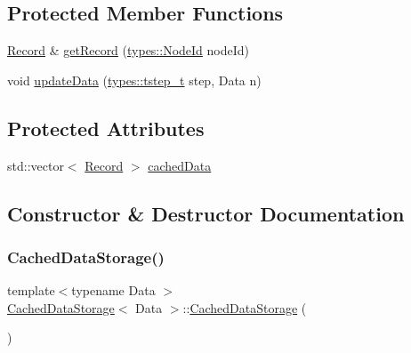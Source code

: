 \subsection*{Protected Member Functions}
\begin{DoxyCompactItemize}
\item 
\mbox{\hyperlink{struct_cached_data_storage_1_1_record}{Record}} \& \mbox{\hyperlink{class_cached_data_storage_a8a09bdedf4fd7f8695149aade0dbf594}{get\+Record}} (\mbox{\hyperlink{classtypes_1_1_node_id}{types\+::\+Node\+Id}} node\+Id)
\item 
void \mbox{\hyperlink{class_cached_data_storage_a12f747193f32aa3b28a6058fb157b693}{update\+Data}} (\mbox{\hyperlink{namespacetypes_a9dc53a5ce11a196d82a6983030de8028}{types\+::tstep\+\_\+t}} step, Data n)
\end{DoxyCompactItemize}
\subsection*{Protected Attributes}
\begin{DoxyCompactItemize}
\item 
std\+::vector$<$ \mbox{\hyperlink{struct_cached_data_storage_1_1_record}{Record}} $>$ \mbox{\hyperlink{class_cached_data_storage_a0cf3c47cb1543564d958cc27a078b411}{cached\+Data}}
\end{DoxyCompactItemize}


\subsection{Constructor \& Destructor Documentation}
\mbox{\label{class_cached_data_storage_a79129be295db29ebdab76a8c0b0d282b}} 
\subsubsection{\texorpdfstring{CachedDataStorage()}{CachedDataStorage()}}
{\footnotesize\ttfamily template$<$typename Data $>$ \\
\mbox{\hyperlink{class_cached_data_storage}{Cached\+Data\+Storage}}$<$ Data $>$\+::\mbox{\hyperlink{class_cached_data_storage}{Cached\+Data\+Storage}} (\begin{DoxyParamCaption}{ }\end{DoxyParamCaption})\hspace{0.3cm}{\ttfamily [inline]}}

